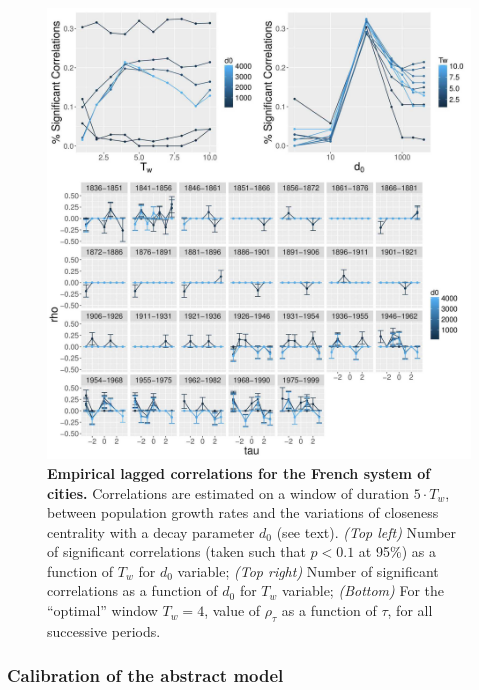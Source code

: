 \documentclass[11pt]{article}
\begin{document}
\begin{figure}
	\includegraphics[width=\linewidth]{figures/6-2-3-fig-macrocoevol-empirical.jpg}
	\caption[Empirical lagged correlations for the French system of cities]{\textbf{Empirical lagged correlations for the French system of cities.} Correlations are estimated on a window of duration $5\cdot T_w$, between population growth rates and the variations of closeness centrality with a decay parameter $d_0$ (see text). \textit{(Top left)} Number of significant correlations (taken such that $p<0.1$ at 95\%) as a function of $T_w$ for $d_0$ variable; \textit{(Top right)} Number of significant correlations as a function of $d_0$ for $T_w$ variable; \textit{(Bottom)} For the ``optimal'' window $T_w = 4$, value of $\rho_{\tau}$ as a function of $\tau$, for all successive periods.\label{fig:macrocoevol:empirical}}
\end{figure}


\subsubsection{Calibration of the abstract model}
\end{document}
